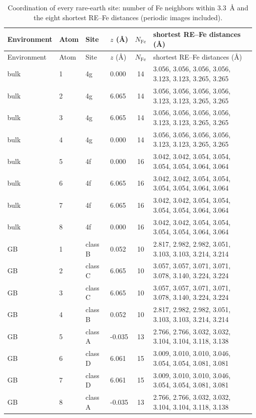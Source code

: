 \begin{longtable}{llllcl}
\caption{Coordination of every rare-earth site: number of Fe neighbors within 3.3~\AA{} and the eight shortest RE--Fe distances (periodic images included).}\label{tab:S3}\\
\toprule
Environment & Atom & Site & $z$ (\AA) & $N_{\mathrm{Fe}}$ & shortest RE--Fe distances (\AA) \\
\midrule
\endfirsthead
\toprule
Environment & Atom & Site & $z$ (\AA) & $N_{\mathrm{Fe}}$ & shortest RE--Fe distances (\AA) \\
\midrule
\endhead
bulk & 1 & 4g & 0.000 & 14 & 3.056, 3.056, 3.056, 3.056, 3.123, 3.123, 3.265, 3.265 \\
bulk & 2 & 4g & 6.065 & 14 & 3.056, 3.056, 3.056, 3.056, 3.123, 3.123, 3.265, 3.265 \\
bulk & 3 & 4g & 6.065 & 14 & 3.056, 3.056, 3.056, 3.056, 3.123, 3.123, 3.265, 3.265 \\
bulk & 4 & 4g & 0.000 & 14 & 3.056, 3.056, 3.056, 3.056, 3.123, 3.123, 3.265, 3.265 \\
bulk & 5 & 4f & 0.000 & 16 & 3.042, 3.042, 3.054, 3.054, 3.054, 3.054, 3.064, 3.064 \\
bulk & 6 & 4f & 6.065 & 16 & 3.042, 3.042, 3.054, 3.054, 3.054, 3.054, 3.064, 3.064 \\
bulk & 7 & 4f & 6.065 & 16 & 3.042, 3.042, 3.054, 3.054, 3.054, 3.054, 3.064, 3.064 \\
bulk & 8 & 4f & 0.000 & 16 & 3.042, 3.042, 3.054, 3.054, 3.054, 3.054, 3.064, 3.064 \\
GB & 1 & class B & 0.052 & 10 & 2.817, 2.982, 2.982, 3.051, 3.103, 3.103, 3.214, 3.214 \\
GB & 2 & class C & 6.065 & 10 & 3.057, 3.057, 3.071, 3.071, 3.078, 3.140, 3.224, 3.224 \\
GB & 3 & class C & 6.065 & 10 & 3.057, 3.057, 3.071, 3.071, 3.078, 3.140, 3.224, 3.224 \\
GB & 4 & class B & 0.052 & 10 & 2.817, 2.982, 2.982, 3.051, 3.103, 3.103, 3.214, 3.214 \\
GB & 5 & class A & -0.035 & 13 & 2.766, 2.766, 3.032, 3.032, 3.104, 3.104, 3.118, 3.138 \\
GB & 6 & class D & 6.061 & 15 & 3.009, 3.010, 3.010, 3.046, 3.054, 3.054, 3.081, 3.081 \\
GB & 7 & class D & 6.061 & 15 & 3.009, 3.010, 3.010, 3.046, 3.054, 3.054, 3.081, 3.081 \\
GB & 8 & class A & -0.035 & 13 & 2.766, 2.766, 3.032, 3.032, 3.104, 3.104, 3.118, 3.138 \\

\end{longtable}
